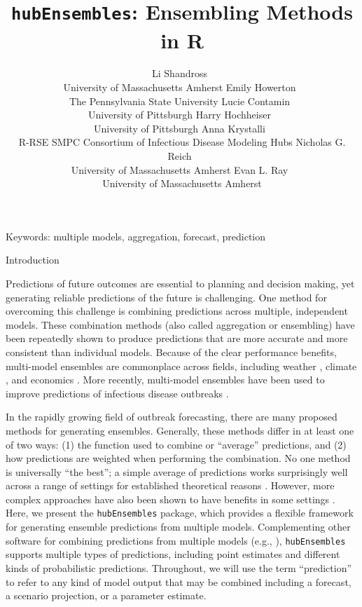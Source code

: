\documentclass[
  article,
  shortnames,
  notitle]{jss}
\author{Li Shandross~\orcidlink{0009-0008-1348-1954}\\University of
Massachusetts Amherst \And Emily
Howerton~\orcidlink{0000-0002-0639-3728}\\The Pennsylvania State
University \AND Lucie
Contamin~\orcidlink{0000-0001-5797-1279}\\University of
Pittsburgh \And Harry
Hochheiser~\orcidlink{0000-0001-8793-9982}\\University of
Pittsburgh \AND Anna Krystalli~\orcidlink{0000-0002-2378-4915}\\R-RSE
SMPC \And Consortium of Infectious Disease Modeling Hubs \AND Nicholas
G. Reich~\orcidlink{0000-0003-3503-9899}\\University of Massachusetts
Amherst \And Evan L. Ray~\orcidlink{0000-0003-4035-0243}\\University of
Massachusetts Amherst}
\title{\texttt{hubEnsembles}: Ensembling Methods in R}
\begin{document}
\maketitle

Keywords: multiple models, aggregation, forecast, prediction

Introduction

Predictions of future outcomes are essential to planning and decision
making, yet generating reliable predictions of the future is
challenging. One method for overcoming this challenge is combining
predictions across multiple, independent models. These combination
methods (also called aggregation or ensembling) have been repeatedly
shown to produce predictions that are more accurate
\citep{clemen1989, timmermann2006b} and more consistent
\citep{hibon2005} than individual models. Because of the clear
performance benefits, multi-model ensembles are commonplace across
fields, including weather \citep{alley2019}, climate
\citep{tebaldi2007}, and economics \citep{aastveit2018}. More recently,
multi-model ensembles have been used to improve predictions of
infectious disease outbreaks
\citep{viboud2018, johansson2019, mcgowan2019, reich_accuracy_2019, cramer2022}.

In the rapidly growing field of outbreak forecasting, there are many
proposed methods for generating ensembles. Generally, these methods
differ in at least one of two ways: (1) the function used to combine or
``average'' predictions, and (2) how predictions are weighted when
performing the combination. No one method is universally ``the best''; a
simple average of predictions works surprisingly well across a range of
settings \citep{mcgowan2019, paireau_ensemble_2022, ray_comparing_2023}
for established theoretical reasons \citep{winkler2015}. However, more
complex approaches have also been shown to have benefits in some
settings
\citep{yamana_superensemble_2016, ray_prediction_2018, reich_accuracy_2019, colon-gonzalez_probabilistic_2021}.
Here, we present the \texttt{hubEnsembles} package, which provides a
flexible framework for generating ensemble predictions from multiple
models. Complementing other software for combining predictions from
multiple models (e.g.,
\citep{pedregosa_scikit-learn_2011, weiss2019, bosse_stackr_2023, couch_stacks_2023}),
\texttt{hubEnsembles} supports multiple types of predictions, including
point estimates and different kinds of probabilistic predictions.
Throughout, we will use the term ``prediction'' to refer to any kind of
model output that may be combined including a forecast, a scenario
projection, or a parameter estimate.
\end{document}
